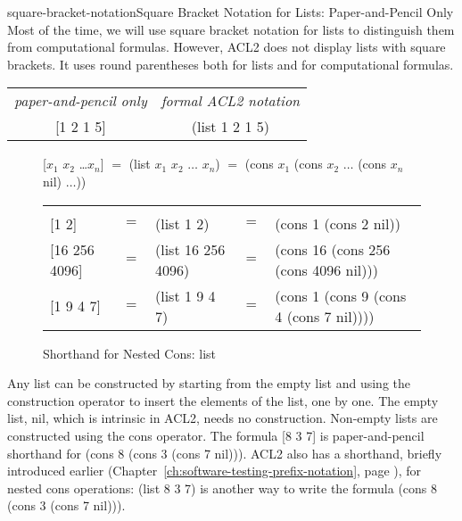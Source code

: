 \begin{aside}{square-bracket-notation}{Square Bracket Notation for Lists: Paper-and-Pencil Only}
Most of the time, we will use square bracket
notation for lists
to distinguish them from computational formulas.
However, ACL2 does not display lists with square brackets.
It uses round parentheses both for lists and for computational formulas.
\begin{center}
\begin{tabular}{cc}
 \emph{paper-and-pencil only} & \emph{formal ACL2 notation}\\
 \textsf{[1 2 1 5]}           & \textsf{(list 1 2 1 5)}\\
\end{tabular}
\end{center}
\end{aside}

\begin{figure}
\begin{center}
\textsf{[$x_1$ $x_2$ \dots $x_n$]} $=$
\textsf{(list $x_1$ $x_2$ $\dots$ $x_n$)} $=$ \textsf{(cons $x_1$ (cons $x_2$ $\dots$ (cons $x_n$ nil) $\dots$))}\\
\addtolength{\tabcolsep}{-4pt}
\begin{tabular}{lclcl}
\hline \\[-1.0em]
\textsf{{[1 2]}}         &$=$ &\textsf{(list 1 2)}        &$=$ &\textsf{(cons 1 (cons 2 nil))}\\
\textsf{{[16 256 4096]}} &$=$ &\textsf{(list 16 256 4096})&$=$ &\textsf{(cons 16 (cons 256 (cons 4096 nil)))}\\
\textsf{{[1 9 4 7]}}     &$=$ &\textsf{(list 1 9 4 7)}    &$=$ &\textsf{(cons 1 (cons 9 (cons 4 (cons 7 nil))))}\\
\end{tabular}
\addtolength{\tabcolsep}{4pt}
\end{center}
\caption{Shorthand for Nested Cons: \textsf{list}}
\label{fig:list-nested-cons}
\end{figure}

Any list can be constructed by starting from the empty list
and using the construction operator to insert the elements of the list, one by one.
The empty list, \textsf{nil}, which is intrinsic in ACL2, needs no construction.
Non-empty lists are constructed using the \textsf{cons} operator.
The formula \textsf{[8 3 7]} is paper-and-pencil shorthand
for \textsf{(cons 8 (cons 3 (cons 7 nil)))}.
ACL2 also has a shorthand, briefly introduced earlier
(Chapter~\ref{ch:software-testing-prefix-notation}, page \pageref{list-op-informal}),
for nested \textsf{cons} operations: \textsf{(list 8 3 7)} is another way to write the formula
\textsf{(cons 8 (cons 3 (cons 7 nil)))}.

